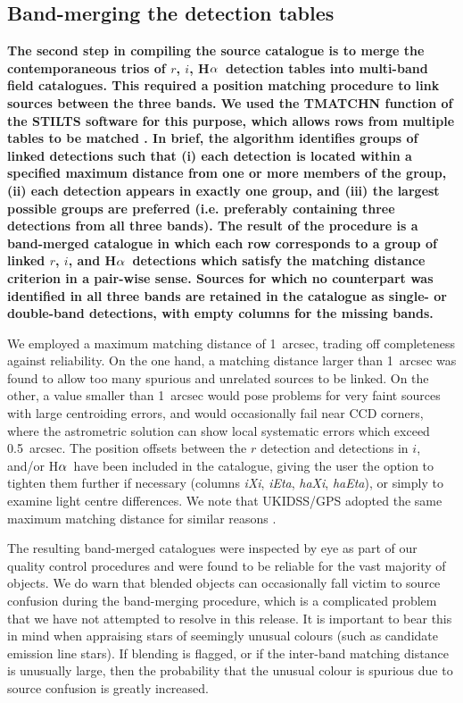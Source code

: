 \documentclass[a4paper,useAMS,usenatbib]{mn2e}
\def\ha{\mbox{H$\rm \alpha$}}
\begin{document}
\subsection{Band-merging the detection tables}

{\bf
The second step in compiling the source catalogue
is to merge the contemporaneous trios
of $r$, $i$, \ha\ detection tables
into multi-band field catalogues.
This required a position matching procedure 
to link sources between the three bands.
We used the TMATCHN function 
of the STILTS software
for this purpose,
which allows rows from multiple tables
to be matched \citep{Taylor2006}.
In brief, the algorithm
identifies groups of linked detections such that
(i) each detection is located within a specified maximum distance from
one or more members of the group,
(ii) each detection appears in exactly one group, and
(iii) the largest possible groups are preferred
(i.e. preferably containing three detections from all three bands).
The result of the procedure is a band-merged catalogue
in which each row corresponds
to a group of linked $r$, $i$, and \ha\ detections
which satisfy the matching distance criterion
in a pair-wise sense.
Sources for which no counterpart was identified
in all three bands are retained in the catalogue
as single- or double-band detections,
with empty columns for the missing bands.

We employed a maximum matching distance of 1~arcsec,
trading off completeness against reliability.
On the one hand, a matching distance larger than 1~arcsec 
was found to allow too many spurious and unrelated sources 
to be linked. 
On the other, a value smaller than 1~arcsec 
would pose problems for very faint sources 
with large centroiding errors, 
and would occasionally fail near CCD corners,
where the astrometric solution can 
show local systematic errors which exceed 0.5~arcsec.
The position offsets between the $r$ detection and detections in $i$, and/or \ha\
have been included in the catalogue, giving the user the option to tighten them 
further if necessary
(columns \emph{iXi}, \emph{iEta}, \emph{haXi}, \emph{haEta}),
or simply to examine light centre differences.
We note that UKIDSS/GPS adopted 
the same maximum matching distance
for similar reasons \citep{Hambly2008}.

The resulting band-merged catalogues were inspected by eye
as part of our quality control procedures
and were found to be reliable for the vast majority of objects.
We do warn that blended objects
can occasionally fall victim to source confusion
during the band-merging procedure,
which is a complicated problem
that we have not attempted to resolve in this release.
It is important to bear this in mind when appraising stars
of seemingly unusual colours (such as candidate emission line stars).
If blending is flagged, or if the inter-band matching distance
is unusually large, then the probability that the unusual colour is 
spurious due to source confusion is greatly increased.
}
\end{document}
